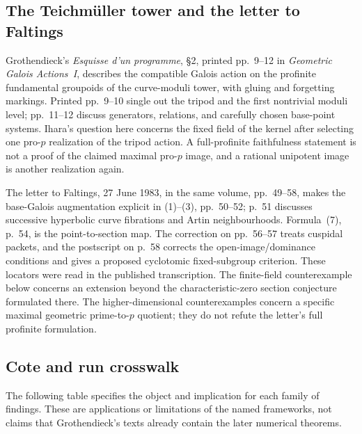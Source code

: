 \subsection{The Teichm\"uller tower and the letter to Faltings}

Grothendieck's \emph{Esquisse d'un programme}, \S2,
printed pp.~9--12 in \emph{Geometric Galois Actions~I},
describes the compatible Galois action on the profinite
fundamental groupoids of the curve-moduli tower, with gluing
and forgetting markings. Printed pp.~9--10 single out the
tripod and the first nontrivial moduli level; pp.~11--12
discuss generators, relations, and carefully chosen base-point
systems. Ihara's question here concerns the fixed field of
the kernel after selecting one pro-$p$ realization of the
tripod action. A full-profinite faithfulness statement is
not a proof of the claimed maximal pro-$p$ image, and a
rational unipotent image is another realization again.

The letter to Faltings, 27 June 1983, in the same volume,
pp.~49--58, makes the base-Galois augmentation explicit in
(1)--(3), pp.~50--52; p.~51 discusses successive hyperbolic
curve fibrations and Artin neighbourhoods. Formula~(7),
p.~54, is the point-to-section map. The correction on
pp.~56--57 treats cuspidal packets, and the postscript on
p.~58 corrects the open-image/dominance conditions and gives
a proposed cyclotomic fixed-subgroup criterion. These
locators were read in the published transcription.
The finite-field counterexample below concerns an extension
beyond the characteristic-zero section conjecture formulated
there. The higher-dimensional counterexamples concern a
specific maximal geometric prime-to-$p$ quotient; they do
not refute the letter's full profinite formulation.

\subsection{Cote and run crosswalk}

The following table specifies the object and implication for
each family of findings. These are applications or limitations
of the named frameworks, not claims that Grothendieck's texts
already contain the later numerical theorems.

